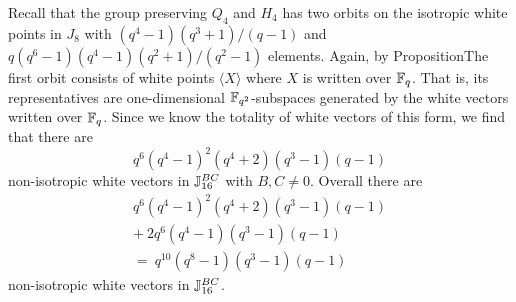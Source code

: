 Recall that the group preserving $Q_4$ and $H_4$ has two orbits on the isotropic white
points in $J_8$ with
$(q^4-1)(q^3+1)/(q-1)$ and $q(q^6-1)(q^4-1)(q^2+1)/(q^2-1)$ elements. Again, by PropositionThe first orbit
consists of white points
$\langle X \rangle$ where $X$ is written over $\mathbb{F}_q$. That is, its representatives are
one-dimensional $\mathbb{F}_{q^2}$-subspaces generated by the white vectors written over $\mathbb{F}_q$.
Since we know the totality of white vectors of this form, we find that there are
\begin{equation}
	q^6(q^4-1)^2(q^4+2)(q^3-1)(q-1)
\end{equation}
non-isotropic white vectors in $\mathbb{J}_{16}^{BC}$ with $B,C\neq 0$. Overall there are
\begin{multline}
	q^6(q^4-1)^2(q^4+2)(q^3-1)(q-1)\\
	+\ 2q^6(q^4-1)(q^3-1)(q-1)\\
	=\ q^{10}(q^8-1)(q^3-1)(q-1)
\end{multline}
non-isotropic white vectors in $\mathbb{J}_{16}^{BC}$.